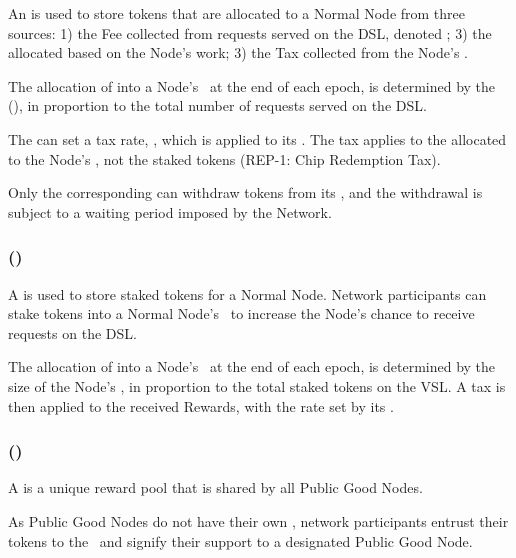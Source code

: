 An  is used to store tokens that are allocated to a Normal Node from three sources: 1) the \gls{Fee} collected from requests served on the \gls{DSL}, denoted \work; 3) the  allocated based on the Node’s work; 3) the \gls{Tax} collected from the Node's \stakingPool.

The allocation of  into a Node's \operationPool\ at the end of each epoch, is determined by the  (\work), in proportion to the total number of requests served on the \gls{DSL}.

The  can set a tax rate, \taxRate, which is applied to its \stakingPool.
The tax applies to the  allocated to the Node's \stakingPool, not the staked tokens (REP-1: Chip Redemption Tax).

Only the corresponding  can withdraw tokens from its \operationPool, and the withdrawal is subject to a waiting period imposed by the Network.

\subsubsection{ (\stakingPool)}
\label{subsubsec:staking_pool}

A  is used to store staked tokens for a Normal Node. Network participants can stake tokens into a Normal Node's \stakingPool\ to increase the Node's chance to receive requests on the \gls{DSL}.

The allocation of  into a Node's \stakingPool\ at the end of each epoch, is determined by the size of the Node's \stakingPool, in proportion to the total staked tokens on the \gls{VSL}.
A tax is then applied to the received Rewards, with the rate set by its .

\subsubsection{ (\publicGoodPool)}

A  is a unique reward pool that is shared by all Public Good Nodes.

As Public Good Nodes do not have their own \stakingPool, network participants entrust their tokens to the \publicGoodPool\ and signify their support to a designated Public Good Node.

\subsection{}
\label{subsec:network_rewards}

